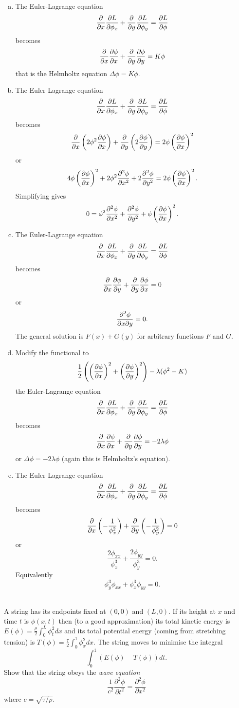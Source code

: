 \documentclass[12pt]{article}
\begin{document}
\begin{answer}
\begin{enumerate}[(a)]
\item The Euler-Lagrange equation
\[\pd{}{x}\pd{L}{\phi_x}+\pd{}{y}\pd{L}{\phi_y}=\pd{L}{\phi}\]
becomes
\[\pd{}{x}\pd{\phi}{x}+\pd{}{y}\pd{\phi}{y}=K\phi\]
that is the Helmholtz equation $\Delta\phi=K\phi$.
\item The Euler-Lagrange equation
\[\pd{}{x}\pd{L}{\phi_x}+\pd{}{y}\pd{L}{\phi_y}=\pd{L}{\phi}\]
becomes
\[\pd{}{x}\left(2\phi^2\pd{\phi}{x}\right)+\pd{}{y}\left(2\pd{\phi}{y}\right)=2\phi\left(\pd{\phi}{x}\right)^2\]
or
\[4\phi\left(\pd{\phi}{x}\right)^2+2\phi^2\ppd{\phi}{x}+2\ppd{\phi}{y}=2\phi\left(\pd{\phi}{x}\right)^2.\]
Simplifying gives
\[0=\phi^2\ppd{\phi}{x}+\ppd{\phi}{y}+\phi\left(\pd{\phi}{x}\right)^2.\]
\item The Euler-Lagrange equation
\[\pd{}{x}\pd{L}{\phi_x}+\pd{}{y}\pd{L}{\phi_y}=\pd{L}{\phi}\]
becomes
\[\pd{}{x}\pd{\phi}{y}+\pd{}{y}\pd{\phi}{x}=0\]
or
\[\ppdd{\phi}{x}{y}=0.\]
The general solution is $F(x)+G(y)$ for arbitrary functions $F$ and $G$.
\item Modify the functional to
\[\frac{1}{2}\left(\left(\pd{\phi}{x}\right)^2+\left(\pd{\phi}{y}\right)^2\right)-\lambda(\phi^2-K)\]
the Euler-Lagrange equation
\[\pd{}{x}\pd{L}{\phi_x}+\pd{}{y}\pd{L}{\phi_y}=\pd{L}{\phi}\]
becomes
\[\pd{}{x}\pd{\phi}{x}+\pd{}{y}\pd{\phi}{y}=-2\lambda\phi\]
or $\Delta\phi=-2\lambda\phi$ (again this is Helmholtz's equation).
\item The Euler-Lagrange equation
\[\pd{}{x}\pd{L}{\phi_x}+\pd{}{y}\pd{L}{\phi_y}=\pd{L}{\phi}\]
becomes
\[\pd{}{x}\left(-\frac{1}{\phi_x^2}\right)+\pd{}{y}\left(-\frac{1}{\phi_y^2}\right)=0\]
or
\[\frac{2\phi_{xx}}{\phi_x^3}+\frac{2\phi_{yy}}{\phi_y^3}=0.\]
Equivalently
\[\phi_y^3\phi_{xx}+\phi_x^3\phi_{yy}=0.\]
\end{enumerate}
\end{answer}

\bigskip

\begin{question}\ \\
A string has its endpoints fixed at $(0,0)$ and $(L,0)$. If its height at $x$ and time $t$ is $\phi(x,t)$ then (to a good approximation) its total kinetic energy is $E(\phi)=\frac{\rho}{2}\int_0^L\phi_t^2dx$ and its total potential energy (coming from stretching tension) is $T(\phi)=\frac{\tau}{2}\int_0^1\phi_x^2dx$. The string moves to minimise the integral
\[\int_0^1(E(\phi)-T(\phi))dt.\]
Show that the string obeys the {\em wave equation}
\[\frac{1}{c^2}\frac{\partial^2\phi}{\partial t^2}=\frac{\partial^2\phi}{\partial x^2}\]
where $c=\sqrt{\tau/\rho}$.
\end{question}
\end{document}
